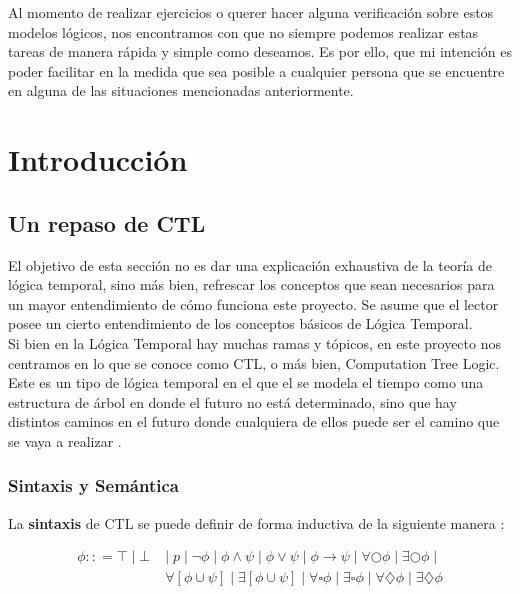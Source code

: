\documentclass[11pt]{article}
\begin{document}
Al momento de realizar ejercicios o querer hacer alguna verificación sobre estos
modelos lógicos, nos encontramos con que no siempre podemos realizar estas tareas 
de manera rápida y simple como deseamos. Es por ello, que mi intención es poder 
facilitar en la medida que sea posible a cualquier persona que se encuentre en 
alguna de las situaciones mencionadas anteriormente.  

\section{Introducción}

\subsection{Un repaso de CTL}
El objetivo de esta sección no es dar una explicación exhaustiva de la teoría de 
lógica temporal, sino más bien, refrescar los conceptos que sean necesarios 
para un mayor entendimiento de cómo funciona este proyecto. Se asume que el lector
posee un cierto entendimiento de los conceptos básicos de Lógica Temporal. \\

Si bien en la Lógica Temporal hay muchas ramas y tópicos, en este proyecto nos 
centramos en lo que se conoce como CTL, o más bien, Computation Tree Logic. Este
es un tipo de lógica temporal en el que el se modela el tiempo como una estructura
de árbol en donde el futuro no está determinado, sino que hay distintos caminos 
en el futuro donde cualquiera de ellos puede ser el camino que se vaya a realizar \cite{logicbook}.

\subsubsection{Sintaxis y Semántica}

La \textbf{sintaxis} de CTL se puede definir de forma inductiva de la siguiente manera \cite{theory}:

\begin{align*}
  \phi :: = \top                       \; | \;  
            \bot                       \; & | \; 
            p                          \; | \; 
            \neg \phi                  \; | \;
            \phi \land \psi            \; | \;
            \phi \lor \psi             \; | \;
            \phi \rightarrow \psi      \; | \;
            \forall \bigcirc \phi      \; | \;
            \exists \bigcirc \phi      \; | \; \\
            & \forall [\phi \cup \psi] \; | \;
            \exists [\phi \cup \psi]   \; | \;
            \forall \square \phi       \; | \;
            \exists \square \phi       \; | \;
            \forall \diamondsuit \phi  \; | \;
            \exists \diamondsuit \phi 
\end{align*}
\end{document}
